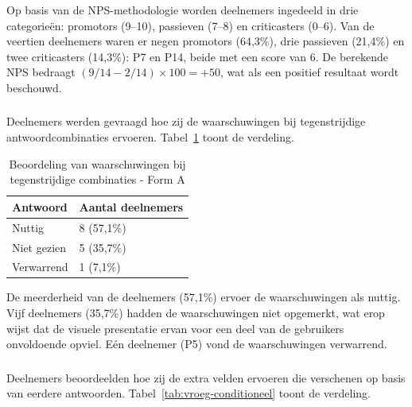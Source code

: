 Op basis van de NPS-methodologie worden deelnemers ingedeeld in drie categorieën: promotors (9–10), passieven (7–8) en criticasters (0–6). Van de veertien deelnemers waren er negen promotors (64,3\%), drie passieven (21,4\%) en twee criticasters (14,3\%): P7 en P14, beide met een score van 6. De berekende NPS bedraagt $(9/14 - 2/14) \times 100 = +50$, wat als een positief resultaat wordt beschouwd.

\subsubsection{}

Deelnemers werden gevraagd hoe zij de waarschuwingen bij tegenstrijdige antwoordcombinaties ervoeren. Tabel~\ref{tab:vroeg-waarschuwingen} toont de verdeling.

\begin{table}[h]
  \centering
  \caption[Beoordeling waarschuwingen vroege test Form A]{Beoordeling van waarschuwingen bij tegenstrijdige combinaties - Form A}
  \label{tab:vroeg-waarschuwingen}
  \begin{tabular}{ll}
    \hline
    \textbf{Antwoord} & \textbf{Aantal deelnemers} \\
    \hline
    Nuttig      & 8 (57,1\%) \\
    Niet gezien & 5 (35,7\%) \\
    Verwarrend  & 1 (7,1\%)  \\
    \hline
  \end{tabular}
\end{table}

De meerderheid van de deelnemers (57,1\%) ervoer de waarschuwingen als nuttig. Vijf deelnemers (35,7\%) hadden de waarschuwingen niet opgemerkt, wat erop wijst dat de visuele presentatie ervan voor een deel van de gebruikers onvoldoende opviel. Eén deelnemer (P5) vond de waarschuwingen verwarrend.

\subsubsection{}

Deelnemers beoordeelden hoe zij de extra velden ervoeren die verschenen op basis van eerdere antwoorden. Tabel~\ref{tab:vroeg-conditioneel} toont de verdeling.

